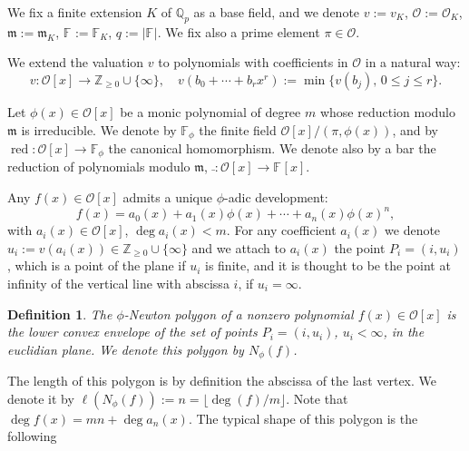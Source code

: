 \documentclass{amsart}
\newtheorem{definition}[theorem]{Definition}
\newcommand{\Z}{\mathbb Z}
\newcommand{\Q}{\mathbb Q}
\def\op{\operatorname}
\def\dg{\op{deg}}
\def\ff#1{\mathbb{F}_{#1}}
\def\fph{\mathbb{F}_{\phi}}
\def\lra{\longrightarrow}
\def\m{{\mathfrak m}}
\def\nph#1{N_{\phi}(#1)}
\def\oo{{\mathcal O}}
\def\rd{\op{red}}
\def\zpx{\oo[x]}
\begin{document}
We fix a finite extension $K$ of $\Q_p$ as a base field, and we denote $v:=v_K$, $\oo:=\oo_K$, $\m:=\m_K$, $\ff{}:=\ff{K}$, $q:=|\ff{}|$. We fix also a prime element $\pi\in\oo$.

We extend the valuation $v$ to polynomials with coefficients in $\oo$ in a natural way:
$$
v\colon \zpx\lra \Z_{\ge0}\cup\{\infty\},\quad v(b_0+\cdots+b_rx^r):=\min\{v(b_j),\,0\le j\le r\}.
$$

Let $\phi(x)\in\zpx$ be a monic polynomial of degree $m$ whose reduction mo\-dulo $\m$ is irreducible. We denote by $\fph$ the finite field $\zpx/(\pi,\phi(x))$, and by $\rd\colon \zpx\lra \fph$
the canonical homomorphism. We denote also by a bar the reduction of polynomials modulo $\m$, $\bar{\ }\colon\zpx\lra\ff{}[x]$.

Any $f(x)\in\zpx$ admits a unique $\phi$-adic development:
$$ 
f(x)=a_0(x)+a_1(x)\phi(x)+\cdots+a_n(x)\phi(x)^n,
$$with $a_i(x)\in\zpx$, $\dg a_i(x)<m$. For any coefficient $a_i(x)$ we denote $u_i:=v(a_i(x))\in\Z_{\ge0}\cup\{\infty\}$ and we attach to $a_i(x)$ the point $P_i=(i,u_i)$, which is a point of the plane if $u_i$ is finite, and it is thought to be the point at infinity of the vertical line with abscissa $i$, if $u_i=\infty$.

\begin{definition}
The $\phi$-Newton polygon of a nonzero polynomial $f(x)\in\zpx$ is the lower convex envelope of the set of points $P_i=(i,u_i)$, $u_i<\infty$, in the euclidian plane.
We denote this polygon by $\nph{f}$.
\end{definition}

The length of this polygon is by definition the abscissa of the last vertex. We denote it by  $\ell(\nph{f}):=n=\lfloor \dg(f)/m\rfloor$. Note that $\dg f(x)=m n+\dg a_n(x)$. The typical shape of this polygon is the following
\end{document}
